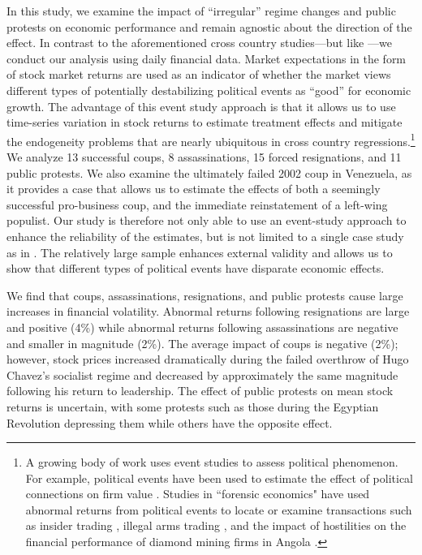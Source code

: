 \documentclass[12pt,final,fleqn]{article}
\theoremstyle{plain}
\begin{document}
In this study, we examine the impact of ``irregular'' regime changes and public protests on economic performance and remain agnostic about the direction of the effect. In contrast to the aforementioned cross country studies---but like \citet{girardi2018institution}---we conduct our analysis using daily financial data. Market expectations in the form of stock market returns are used as an indicator of whether the market views different types of potentially destabilizing political events as ``good'' for economic growth. The advantage of this event study approach is that it allows us to use time-series variation in stock returns to estimate treatment effects and mitigate the endogeneity problems that are nearly ubiquitous in cross country regressions.\footnote{A growing body of work uses event studies to assess political phenomenon.  For example, political events have been used to estimate the effect of political connections on firm value \citep[e.g.][]{fisman2001estimating,faccio2006politically,goldman2009politically}. Studies in ``forensic economics" have used abnormal returns from political events to locate or examine transactions such as insider trading \citep{dube2011coups}, illegal arms trading \citep{dellavigna2010detecting}, and the impact of hostilities on the financial performance of diamond mining firms in Angola \citep{guidolin2007diamonds}.} We analyze 13 successful coups, 8 assassinations, 15 forced resignations, and 11 public protests. We also examine the ultimately failed 2002 coup in Venezuela, as it provides a case that allows us to estimate the effects of both a seemingly successful pro-business coup, and the immediate reinstatement of a left-wing populist. Our study is therefore not only able to use an event-study approach to enhance the reliability of the estimates, but is not limited to a single case study as in \citet{girardi2018institution}. The relatively large sample enhances external validity and allows us to show that different types of political events have disparate economic effects. 

We find that coups, assassinations, resignations, and public protests cause large increases in financial volatility. Abnormal returns following resignations are large and positive (4\%) while abnormal returns following assassinations are negative and smaller in magnitude (2\%). The average impact of coups is negative (2\%); however, stock prices increased dramatically during the failed overthrow of Hugo Chavez's socialist regime and decreased by approximately the same magnitude following his return to leadership. The effect of public protests on mean stock returns is uncertain, with some protests such as those during the Egyptian Revolution depressing them while others have the opposite effect. 
\end{document}
